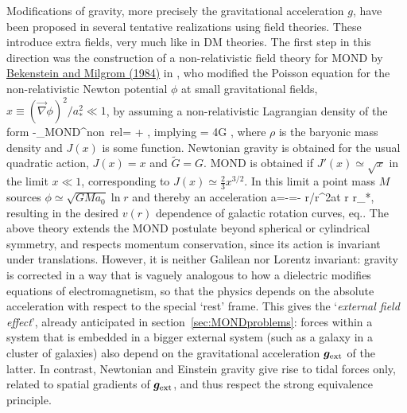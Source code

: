 \medskip

Modifications of gravity, more precisely the gravitational acceleration $g$, have been proposed in several tentative realizations using field theories. These introduce extra fields, very much like in DM theories. 
The first step in this direction was the construction of a non-relativistic field theory for MOND 
by \href{https://doi.org/10.1086/162570}{Bekenstein and Milgrom (1984)} in \cite{MONDth}, who
modified the Poisson equation for the non-relativistic Newton potential $\phi$
at small gravitational fields, $ x \equiv (\vec\nabla \phi)^2/ a_*^2 \ll 1$, by assuming a non-relativistic Lagrangian density of the form
\beq 
-\Lag_{\rm MOND}^{\rm non~rel}=  
 + \phi \rho,\qquad
 \hbox{implying}\qquad
\vec{\nabla}\cdot {} = 4\pi \tilde G \rho,
\eeq
where $\rho$  is the baryonic mass density and $J(x)$ is some function.
Newtonian gravity is obtained for the usual quadratic action, $J(x)=x$ and $\tilde G = G$.
MOND is obtained if $J' (x)\simeq \sqrt{x}$ in the limit $x\ll 1$, corresponding to  
$J(x) \simeq \frac23 x^{3/2}$.
In this limit a point mass $M$ sources $\phi \simeq \sqrt{GM a_0}\ln r$ and thereby an acceleration 
\beq \vec a=-\vec \nabla \phi =- \vec r/r^2\qquad\hbox{at} 
\qquad r \gg r_*\equiv {},\eeq
resulting in the desired $v(r)$ dependence of galactic rotation curves, eq.. 
The above theory extends the MOND postulate beyond spherical or cylindrical symmetry,
and respects momentum conservation, since its action is invariant under translations.
However, it is  neither Galilean nor Lorentz invariant: 
gravity is corrected in a way that is vaguely analogous to how a dielectric modifies equations of  electromagnetism, 
so that the physics depends on the absolute acceleration with respect to the special `rest' frame.
This gives the `{\em external field effect}', already anticipated in section~\ref{sec:MONDproblems}:
forces within a system that is embedded in a bigger external system (such as a galaxy in a cluster of galaxies)
also depend on the gravitational acceleration $\vec{g}_{\rm ext}$ of the latter.
In contrast, Newtonian and Einstein gravity give rise to tidal forces only, 
related to spatial gradients of $\vec{g}_{\rm ext}$, and thus respect the strong equivalence principle.

\smallskip

